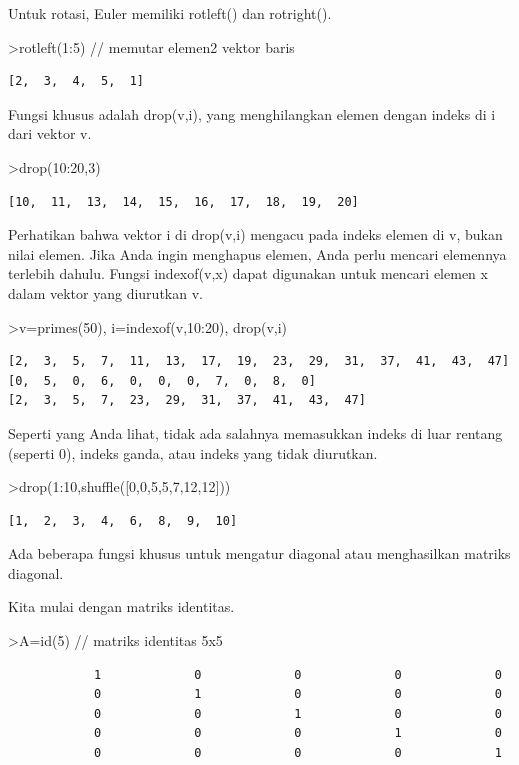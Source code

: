 \documentclass[
]{book}
\begin{document}
Untuk rotasi, Euler memiliki rotleft() dan rotright().

\textgreater rotleft(1:5) // memutar elemen2 vektor baris

\begin{verbatim}
[2,  3,  4,  5,  1]
\end{verbatim}

Fungsi khusus adalah drop(v,i), yang menghilangkan elemen dengan indeks di i dari vektor v.

\textgreater drop(10:20,3)

\begin{verbatim}
[10,  11,  13,  14,  15,  16,  17,  18,  19,  20]
\end{verbatim}

Perhatikan bahwa vektor i di drop(v,i) mengacu pada indeks elemen di v, bukan nilai elemen. Jika Anda ingin menghapus elemen, Anda perlu mencari elemennya terlebih dahulu. Fungsi indexof(v,x) dapat digunakan untuk mencari elemen x dalam vektor yang diurutkan v.

\textgreater v=primes(50), i=indexof(v,10:20), drop(v,i)

\begin{verbatim}
[2,  3,  5,  7,  11,  13,  17,  19,  23,  29,  31,  37,  41,  43,  47]
[0,  5,  0,  6,  0,  0,  0,  7,  0,  8,  0]
[2,  3,  5,  7,  23,  29,  31,  37,  41,  43,  47]
\end{verbatim}

Seperti yang Anda lihat, tidak ada salahnya memasukkan indeks di luar rentang (seperti 0), indeks ganda, atau indeks yang tidak diurutkan.

\textgreater drop(1:10,shuffle({[}0,0,5,5,7,12,12{]}))

\begin{verbatim}
[1,  2,  3,  4,  6,  8,  9,  10]
\end{verbatim}

Ada beberapa fungsi khusus untuk mengatur diagonal atau menghasilkan matriks diagonal.

Kita mulai dengan matriks identitas.

\textgreater A=id(5) // matriks identitas 5x5

\begin{verbatim}
            1             0             0             0             0 
            0             1             0             0             0 
            0             0             1             0             0 
            0             0             0             1             0 
            0             0             0             0             1 
\end{verbatim}
\end{document}
